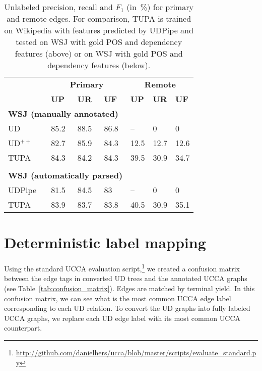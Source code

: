 \documentclass[11pt,a4paper]{article}
\begin{document}
\begin{table}[t]
\centering
\begin{tabular}{l|lll|lll}
& \multicolumn{3}{c|}{\footnotesize \bf Primary} & \multicolumn{3}{c}{\footnotesize \bf Remote} \\
& \footnotesize \textbf{UP} & \footnotesize \textbf{UR} & \footnotesize \textbf{UF}
& \footnotesize \textbf{UP} & \footnotesize \textbf{UR} & \footnotesize \textbf{UF} \\
\hline
\multicolumn{4}{l|}{\small \bf WSJ (manually annotated)} & \\
\footnotesize UD
& 85.2 & 88.5 & 86.8 & -- & 0 & 0 \\
\footnotesize UD$^{++}$
& 82.7 & 85.9 & 84.3 & 12.5 & 12.7 & 12.6 \\
\footnotesize TUPA
& 84.3 & 84.2 & 84.3 & 39.5 & 30.9 & 34.7 \\
\\
\multicolumn{4}{l|}{\small \bf WSJ (automatically parsed)} & \\
UDPipe & 81.5 & 84.5 & 83 & -- & 0 & 0 \\
\footnotesize TUPA
& 83.9 & 83.7 & 83.8 & 40.5 & 30.9 & 35.1
\end{tabular}
\caption{
Unlabeled precision, recall and $F_1$ (in~\%) for primary and remote edges.
For comparison, TUPA \protect\cite{hershcovich2017a} is trained on Wikipedia with features predicted by UDPipe
and tested on WSJ with gold POS and dependency features (above)
or on WSJ with gold POS and dependency features (below).
\label{tab:conversion_results_unlabeled}}
\end{table}


\section{Deterministic label mapping}\label{sec:mapping}


Using the standard UCCA evaluation
script,\footnote{\url{http://github.com/danielhers/ucca/blob/master/scripts/evaluate_standard.py}}
we created a confusion matrix between the edge tags in converted UD trees
and the annotated UCCA graphs (see Table~\ref{tab:confusion_matrix}).
Edges are matched by terminal yield.
In this confusion matrix, we can see what is the most common UCCA edge label corresponding
to each UD relation.
To convert the UD graphs into fully labeled UCCA graphs,
we replace each UD edge label with its most common UCCA counterpart.
\end{document}
